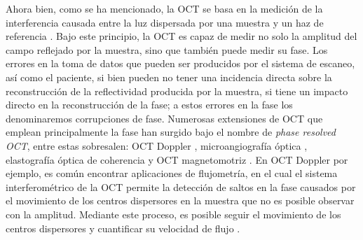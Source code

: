 
Ahora bien, como se ha mencionado, la OCT se basa en la medición de la interferencia causada entre la luz dispersada por una muestra y un haz de referencia \cite{Huang1991}. Bajo este principio, la OCT es capaz de medir no solo la amplitud del campo reflejado por la muestra, sino que también puede medir su fase. Los errores en la toma de datos que pueden ser producidos por el sistema de escaneo, así como el paciente, si bien pueden no tener una incidencia directa sobre la reconstrucción de la reflectividad producida por la muestra, si tiene un impacto directo en la reconstrucción de la fase; a estos errores en la fase los denominaremos corrupciones de fase. Numerosas extensiones de OCT que emplean principalmente la fase han surgido bajo el nombre de \emph{phase resolved OCT}, entre estas sobresalen: OCT Doppler \cite{Chen1999}, microangiografía óptica \cite{Wang2010}, elastografía óptica de coherencia \cite{Ruikang2007} y OCT magnetomotriz \cite{Oldenburg2005}. En OCT Doppler por ejemplo, es común encontrar aplicaciones de flujometría, en el cual el sistema interferométrico de la OCT permite la detección de saltos en la fase causados por el movimiento de los centros dispersores en la muestra que no es posible observar con la amplitud. Mediante este proceso, es posible seguir el movimiento de los centros dispersores y cuantificar su velocidad de flujo \cite{Chen1999}. 

